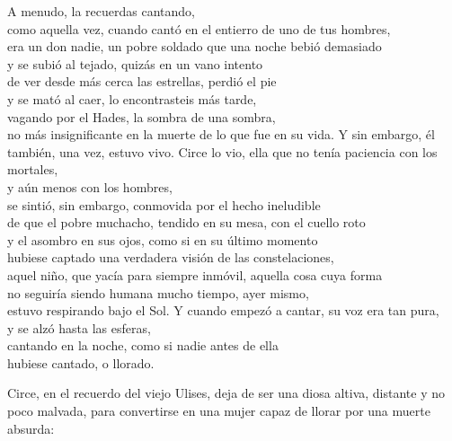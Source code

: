 \begin{versopropio}
A menudo, la recuerdas cantando,\\
como aquella vez, cuando cantó en el entierro de uno de tus hombres,\\
era un don nadie, un pobre soldado que una noche bebió demasiado\\
y se subió al tejado, quizás en un vano intento\\
de ver desde más cerca las estrellas, perdió el pie\\
y se mató al caer, lo encontrasteis más tarde,\\
vagando por el Hades, la sombra de una sombra,\\
no más insignificante en la muerte de lo que fue en su vida.
\stanzabreak
Y sin embargo, él también, una vez, estuvo vivo.
\stanzabreak
Circe lo vio, ella que no tenía paciencia con los mortales,\\
y aún menos con los hombres,\\
se sintió, sin embargo, conmovida por el hecho ineludible\\
de que el pobre muchacho, tendido en su mesa, con el cuello roto\\
y el asombro en sus ojos, como si en su último momento\\
hubiese captado una verdadera visión de las constelaciones,\\
aquel niño, que yacía para siempre inmóvil, aquella cosa cuya forma\\
no seguiría siendo humana mucho tiempo, ayer mismo,\\
estuvo respirando bajo el Sol.
\stanzabreak
Y cuando empezó a cantar, su voz era tan pura,\\
y se alzó hasta las esferas,\\
cantando en la noche, como si nadie antes de ella\\
hubiese cantado, o llorado.
\end{versopropio}

Circe, en el recuerdo del viejo Ulises, deja de ser una diosa altiva, distante y no poco malvada, para convertirse en una mujer capaz de llorar por una muerte absurda:

